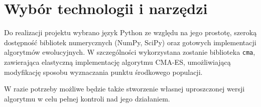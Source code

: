 \documentclass{article}
\begin{document}
\section{Wybór technologii i narzędzi}

Do realizacji projektu wybrano język Python ze względu na jego prostotę, szeroką dostępność bibliotek numerycznych (NumPy, SciPy) oraz gotowych implementacji algorytmów ewolucyjnych. W szczególności wykorzystana zostanie biblioteka \texttt{cma}, zawierająca elastyczną implementację algorytmu CMA-ES, umożliwiającą modyfikację sposobu wyznaczania punktu środkowego populacji.

W razie potrzeby możliwe będzie także stworzenie własnej uproszczonej wersji algorytmu w celu pełnej kontroli nad jego działaniem.  













\end{document}
